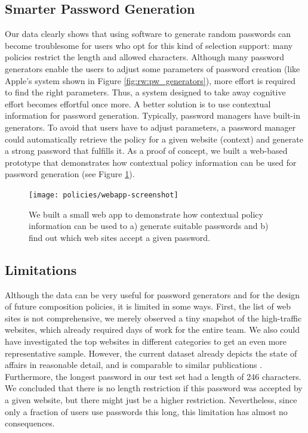 \subsection{Smarter Password Generation}
Our data clearly shows that using software to generate random passwords can become troublesome for users who opt for this kind of selection support: many policies restrict the length and allowed characters. Although many password generators enable the users to adjust some parameters of password creation (like Apple's system shown in Figure \ref{fig:rw:pw_generators}), more effort is required to find the right parameters. Thus, a system designed to take away cognitive effort becomes effortful once more. A better solution is to use contextual information for password generation. Typically, password managers have built-in generators. To avoid that users have to adjust parameters, a password manager could automatically retrieve the policy for a given website (context) and generate a strong password that fulfills it. As a proof of concept, we built a web-based prototype that demonstrates how contextual policy information can be used for password generation (see Figure \ref{fig:policies_reuse:webapp}). 

\begin{figure}
	\centering
	\texttt{[image: policies/webapp-screenshot]}
	\caption{\label{fig:policies_reuse:webapp}We built a small web app to demonstrate how contextual policy information can be used to a) generate suitable passwords and b) find out which web sites accept a given password.}
\end{figure}

\subsection{Limitations}
Although the data can be very useful for password generators and for the design of future composition policies, it is limited in some ways. 
First, the list of web sites is not comprehensive, we merely observed a tiny snapshot of the high-traffic websites, which already required days of work for the entire team. We also could have investigated the top websites in different categories to get an even more representative sample. However, the current dataset already depicts the state of affairs in reasonable detail, and is comparable to similar publications \cite{Florencio2010WhereDoPoliciesComeFrom, Wang2015EmperorsPolicies}. 
Furthermore, the longest password in our test set had a length of 246 characters. We concluded that there is no length restriction if this password was accepted by a given website, but there might just be a higher restriction. Nevertheless, since only a fraction of users use passwords this long, this limitation has almost no consequences.

